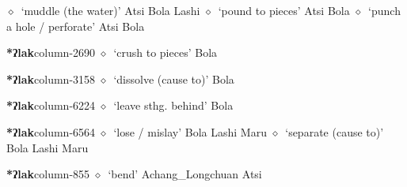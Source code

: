 \hspace{1ex}
         $\diamond$~`muddle (the water)'
         Atsi 
\hspace{1ex}
         Bola 
\hspace{1ex}
         Lashi 
\hspace{1ex}
         $\diamond$~`pound to pieces'
         Atsi 
\hspace{1ex}
         Bola 
\hspace{1ex}
         $\diamond$~`punch a hole / perforate'
         Atsi 
\hspace{1ex}
         Bola 
  \item {\footnotesize \textbf{*ʔlak}}{\tiny column-2690}
         $\diamond$~`crush to pieces'
         Bola 
  \item {\footnotesize \textbf{*ʔlak}}{\tiny column-3158}
         $\diamond$~`dissolve (cause to)'
         Bola 
  \item {\footnotesize \textbf{*ʔlak}}{\tiny column-6224}
         $\diamond$~`leave sthg. behind'
         Bola 
  \item {\footnotesize \textbf{*ʔlak}}{\tiny column-6564}
         $\diamond$~`lose / mislay'
         Bola 
\hspace{1ex}
         Lashi 
\hspace{1ex}
         Maru 
\hspace{1ex}
         $\diamond$~`separate (cause to)'
         Bola 
\hspace{1ex}
         Lashi 
\hspace{1ex}
         Maru 
  \item {\footnotesize \textbf{*ʔlak}}{\tiny column-855}
         $\diamond$~`bend'
         Achang\_Longchuan 
\hspace{1ex}
         Atsi 
\hspace{1ex}
